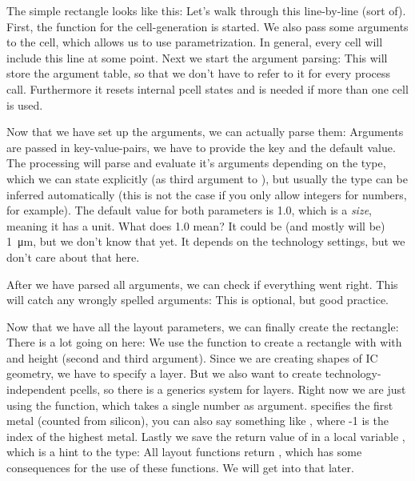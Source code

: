 The simple rectangle looks like this:
Let's walk through this line-by-line (sort of). First, the function for the cell-generation is started. We also pass some arguments to the cell, which allows us to
use parametrization.
In general, every cell will include this line at some point. Next we start the argument parsing:
This will store the argument table, so that we don't have to refer to it for every process call. Furthermore it resets internal pcell states and is needed if more
than one cell is used.

Now that we have set up the arguments, we can actually parse them:
Arguments are passed in key-value-pairs, we have to provide the key and the default value. The processing will parse and evaluate it's arguments depending on the
type, which we can state explicitly (as third argument to ), but usually the type can be inferred automatically (this is not the case
if you only allow integers for numbers, for example). The default value for both parameters is 1.0, which is a \emph{size}, meaning it has a unit. What does 1.0
mean? It could be (and mostly will be) \SI{1}{\micro\meter}, but we don't know that yet. It depends on the technology settings, but we don't care about that here.

After we have parsed all arguments, we can check if everything went right. This will catch any wrongly spelled arguments: 
This is optional, but good practice.

Now that we have all the layout parameters, we can finally create the rectangle:
There is a lot going on here: We use the  function to create a rectangle with with and height (second and third argument). Since we are
creating shapes of IC geometry, we have to specify a layer. But we also want to create technology-independent pcells, so there is a generics system for layers. Right
now we are just using the  function, which takes a single number as argument.  specifies the first metal
(counted from silicon), you can also say something like , where -1 is the index of the highest metal. Lastly we save the return value
of  in a local variable , which is a hint to the type: All layout functions return , which has some
consequences for the use of these functions. We will get into that later.

